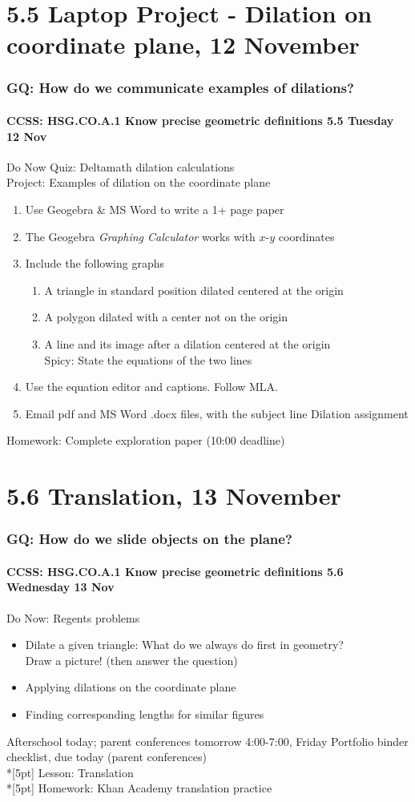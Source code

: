\documentclass{beamer}
\begin{document}
\section{5.5 Laptop Project - Dilation on coordinate plane, 12 November}
\frame
{
\frametitle{GQ: How do we communicate examples of dilations?}
\framesubtitle{CCSS: HSG.CO.A.1 Know precise geometric definitions \hfill \alert{5.5 Tuesday 12 Nov}}

\begin{block}{Do Now Quiz: Deltamath dilation calculations \\[0.5cm]
  Project: Examples of dilation on the coordinate plane}
\begin{enumerate}
  \item Use Geogebra \& MS Word to write a 1+ page paper
  \item The Geogebra \emph{Graphing Calculator} works with $x$-$y$ coordinates
  \item Include the following graphs
  \begin{enumerate}
    \item A triangle in standard position dilated centered at the origin
    \item A polygon dilated with a center not on the origin
    \item A line and its image after a dilation centered at the origin\\
    Spicy: State the equations of the two lines
  \end{enumerate}
  \item Use the equation editor and captions. Follow MLA.
  \item Email pdf and MS Word .docx files, with the subject line Dilation assignment
\end{enumerate}
\end{block}
Homework: Complete exploration paper (10:00 deadline)
}

\section{5.6 Translation, 13 November}
\frame
{
  \frametitle{GQ: How do we slide objects on the plane?}
  \framesubtitle{CCSS: HSG.CO.A.1 Know precise geometric definitions \hfill \alert{5.6 Wednesday 13 Nov}}

  \begin{block}{Do Now: Regents problems}
  \begin{itemize}
    \item Dilate a given triangle: What do we always do first in geometry?\\
    Draw a picture! (then answer the question)
    \item Applying dilations on the coordinate plane
    \item Finding corresponding lengths for similar figures
  \end{itemize}
  \end{block}
  Afterschool today; parent conferences tomorrow 4:00-7:00, Friday
  Portfolio binder checklist, due today (parent conferences)\\*[5pt]
  Lesson: Translation\\*[5pt]
  Homework: Khan Academy translation practice
}
\end{document}
